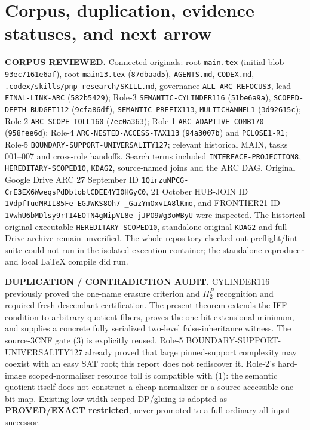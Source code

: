 \documentclass[11pt]{article}
\begin{document}
\section{Corpus, duplication, evidence statuses, and next arrow}
\textbf{CORPUS REVIEWED.} Connected originals:
root \texttt{main.tex} (initial blob \texttt{93ec7161e6af}),
root \texttt{main13.tex} (\texttt{87dbaad5}),
\texttt{AGENTS.md}, \texttt{CODEX.md},
\texttt{.codex/skills/pnp-research/SKILL.md}, governance
\texttt{ALL-ARC-REFOCUS3},
lead \texttt{FINAL-LINK-ARC} (\texttt{582b5429});
Role-3 \texttt{SEMANTIC-CYLINDER116}
(\texttt{51be6a9a}), \texttt{SCOPED-DEPTH-BUDGET112}
(\texttt{9cfa86df}), \texttt{SEMANTIC-PREFIX113},
\texttt{MULTICHANNEL1} (\texttt{3d92615c});
Role-2 \texttt{ARC-SCOPE-TOLL160} (\texttt{7ec0a363});
Role-1 \texttt{ARC-ADAPTIVE-COMB170} (\texttt{958fee6d});
Role-4 \texttt{ARC-NESTED-ACCESS-TAX113} (\texttt{94a3007b})
and \texttt{PCLOSE1-R1};
Role-5 \texttt{BOUNDARY-SUPPORT-UNIVERSALITY127};
relevant historical MAIN, tasks 001--007 and cross-role handoffs.
Search terms included \texttt{INTERFACE-PROJECTION8},
\texttt{HEREDITARY-SCOPED10}, \texttt{KDAG2}, source-named joins
and the ARC DAG. Original Google Drive ARC 27 September
ID \texttt{1QirzuNPCG-CrE3EX6WweqsPdDbtoblCDEE4YI0HGyC0},
21 October HUB-JOIN ID
\texttt{1VdpfTudMRII85Fe-EGJWKS8Oh7-\_GazYmOxvIA8lKmo},
and FRONTIER21 ID
\texttt{1VwhU6bMDlsy9rTI4EOTN4gNipVL8e-jJPO9Wg3oWByU}
were inspected. The historical original executable
\texttt{HEREDITARY-SCOPED10}, standalone original
\texttt{KDAG2} and full Drive archive remain unverified.
The whole-repository checked-out preflight/lint suite
could not run in the isolated execution container;
the standalone reproducer and local LaTeX compile did run.

\textbf{DUPLICATION / CONTRADICTION AUDIT.}
CYLINDER116 previously proved the one-name erasure
criterion and $\Pi_2^P$ recognition and required fresh
descendant certification. The present theorem extends the
IFF condition to arbitrary quotient fibers, proves the
one-bit extensional minimum, and supplies a concrete
fully serialized two-level false-inheritance witness.
The source-3CNF gate (3) is explicitly reused.
Role-5 BOUNDARY-SUPPORT-UNIVERSALITY127 already
proved that large pinned-support complexity may coexist
with an easy SAT root; this report does not rediscover it.
Role-2's hard-image scoped-normalizer resource toll
is compatible with (1): the semantic quotient itself
does not construct a cheap normalizer or a source-accessible
one-bit map. Existing low-width scoped DP/gluing is
adopted as \textbf{PROVED/EXACT restricted}, never
promoted to a full ordinary all-input successor.
\end{document}
